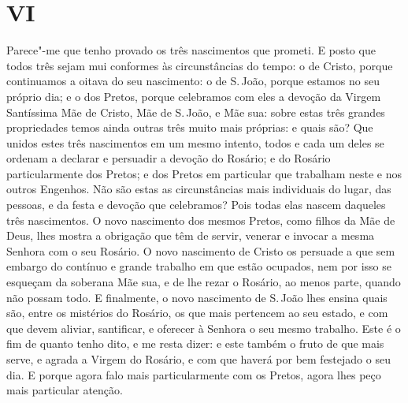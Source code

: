 \section{VI}

Parece"-me que tenho provado os três nascimentos que
prometi. E posto que todos três sejam mui conformes às circunstâncias do
tempo: o de Cristo, porque continuamos a oitava do seu nascimento: o de
S.\,João, porque estamos no seu próprio dia; e o dos Pretos, porque
celebramos com eles a devoção da Virgem Santíssima Mãe de Cristo, Mãe de
S.\,João, e Mãe sua: sobre estas três grandes propriedades temos ainda
outras três muito mais próprias: e quais são? Que unidos estes três
nascimentos em um mesmo intento, todos e cada um deles se ordenam a
declarar e persuadir a devoção do Rosário; e do Rosário particularmente
dos Pretos; e dos Pretos em particular que trabalham neste e nos outros
Engenhos. Não são estas as circunstâncias mais individuais do lugar, das
pessoas, e da festa e devoção que celebramos? Pois todas elas nascem
daqueles três nascimentos. O novo nascimento dos mesmos Pretos, como
filhos da Mãe de Deus, lhes mostra a obrigação que têm de servir,
venerar e invocar a mesma Senhora com o seu Rosário. O novo nascimento
de Cristo os persuade a que sem embargo do contínuo e grande trabalho em
que estão ocupados, nem por isso se esqueçam da soberana Mãe sua, e de
lhe rezar o Rosário, ao menos parte, quando não possam todo. E
finalmente, o novo nascimento de S.\,João lhes ensina quais são, entre os
mistérios do Rosário, os que mais pertencem ao seu estado, e com que
devem aliviar, santificar, e oferecer à Senhora o seu mesmo trabalho.
Este é o fim de quanto tenho dito, e me resta dizer: e este também o
fruto de que mais serve, e agrada a Virgem do Rosário, e com que haverá
por bem festejado o seu dia. E porque agora falo mais particularmente
com os Pretos, agora lhes peço mais particular atenção.

